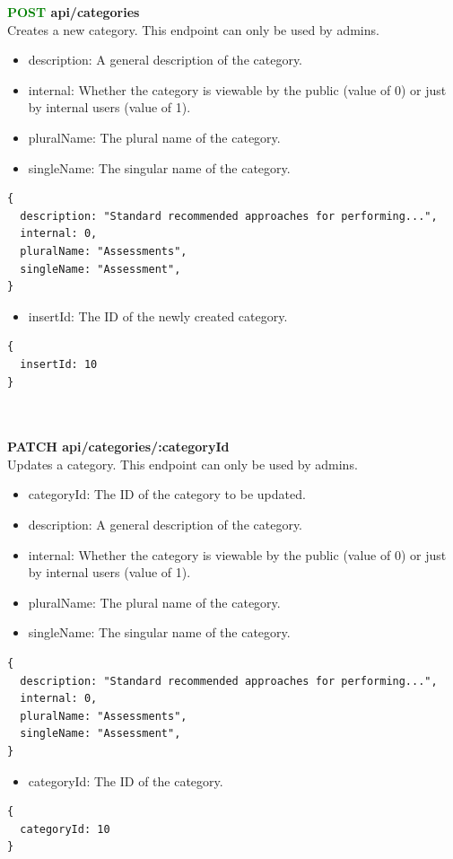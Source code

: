 \documentclass[onecolumn, draftclsnofoot,10pt, compsoc, usenames, dvipsnames]{IEEEtran}
\begin{document}
\noindent
\textbf{\textcolor{Green}{POST} api/categories} \\
Creates a new category. This endpoint can only be used by admins.
\begin{itemize}
    \item description: A general description of the category.
    \item internal: Whether the category is viewable by the public (value of 0) or just by internal users (value of 1).
    \item pluralName: The plural name of the category.
    \item singleName: The singular name of the category.
\end{itemize}
\begin{lstlisting}[caption=Example Request Body]
{ 
  description: "Standard recommended approaches for performing...",
  internal: 0,
  pluralName: "Assessments",
  singleName: "Assessment",
}
\end{lstlisting}
\begin{itemize}
  \item insertId: The ID of the newly created category.
\end{itemize}
\begin{lstlisting}[caption=Example Response]
{
  insertId: 10
}
\end{lstlisting}
\\~\\


\noindent
\textbf{\textcolor{BlueGreen}{PATCH} api/categories/:categoryId} \\
Updates a category. This endpoint can only be used by admins.
\begin{itemize}
    \item categoryId: The ID of the category to be updated.
    \item description: A general description of the category.
    \item internal: Whether the category is viewable by the public (value of 0) or just by internal users (value of 1).
    \item pluralName: The plural name of the category.
    \item singleName: The singular name of the category.
\end{itemize}
\begin{lstlisting}[caption=Example Request Body]
{ 
  description: "Standard recommended approaches for performing...",
  internal: 0,
  pluralName: "Assessments",
  singleName: "Assessment",
}
\end{lstlisting}
\begin{itemize}
  \item categoryId: The ID of the category.
\end{itemize}
\begin{lstlisting}[caption=Example Response]
{
  categoryId: 10
}
\end{lstlisting}
\\~\\
\end{document}
